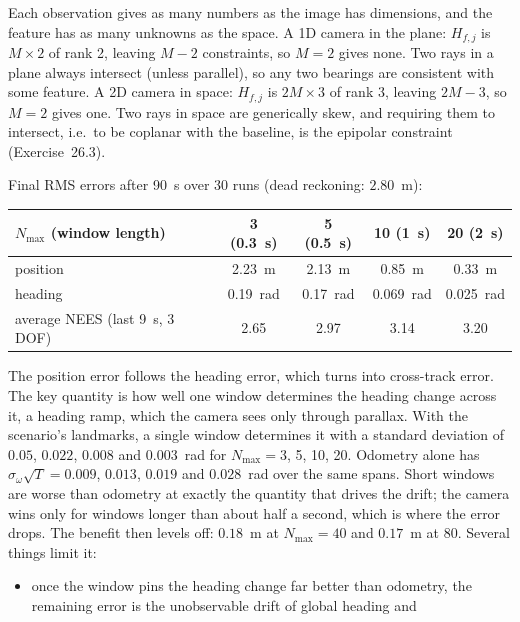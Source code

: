 \begin{solutions}
  \item Each observation gives as many numbers as the image has dimensions, and the feature has as many unknowns as the space. A 1D camera in the plane: $H_{f,j}$ is
        $M\times2$ of rank 2, leaving $M - 2$ constraints, so $M = 2$ gives none. Two rays in a plane always intersect (unless parallel), so any two bearings are consistent with some
        feature. A 2D camera in space: $H_{f,j}$ is $2M\times3$ of rank 3, leaving $2M - 3$, so $M = 2$ gives one. Two rays in space are generically skew, and requiring them to intersect,
        i.e.\ to be coplanar with the baseline, is the epipolar constraint (Exercise~26.3).

  \item Final RMS errors after 90~s over 30 runs (dead reckoning: $2.80$~m):
        \begin{center}\small
        \begin{tabular}{@{}l c c c c@{}}
        \toprule
        $N_{\max}$ (window length) & 3 (0.3~s) & 5 (0.5~s) & 10 (1~s) & 20 (2~s) \\
        \midrule
        position & 2.23~m & 2.13~m & 0.85~m & 0.33~m \\
        heading & 0.19~rad & 0.17~rad & 0.069~rad & 0.025~rad \\
        average NEES (last 9~s, 3 DOF) & 2.65 & 2.97 & 3.14 & 3.20 \\
        \bottomrule
        \end{tabular}
        \end{center}
        The position error follows the heading error, which turns into cross-track error. The key quantity is how well one window determines the heading
        change across it, a heading ramp, which the camera sees only through parallax. With the scenario's landmarks, a single window determines it with a
        standard deviation of $0.05$, $0.022$, $0.008$ and $0.003$~rad for $N_{\max} = 3$, 5, 10, 20. Odometry alone has $\sigma_\omega\sqrt T = 0.009$, $0.013$, $0.019$ and $0.028$~rad over the same spans.
        Short windows are worse than odometry at exactly the quantity that drives the drift; the camera wins only for windows longer than about half a second,
        which is where the error drops. The benefit then levels off: $0.18$~m at $N_{\max} = 40$ and $0.17$~m at 80. Several things limit it:
        \begin{itemize}
          \item once the window pins the heading change far better than odometry, the remaining error is the unobservable drift of global heading and

\end{itemize}
\end{solutions}
